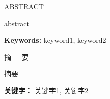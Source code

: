 \begin{center}
	ABSTRACT
\end{center}

abstract

\noindent\heiti{}\textbf{Keywords:}
keyword1, keyword2

\vskip 5mm
\begin{center}
\heiti{}
摘~~~要
\end{center}

\songti{}
摘要

\noindent\heiti{}\textbf{关键字： }
关键字1, 关键字2

\clearpage


